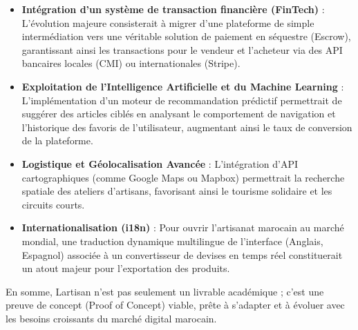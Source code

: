 \begin{itemize}
    \item \textbf{Intégration d'un système de transaction financière (FinTech)} : L'évolution majeure consisterait à migrer d'une plateforme de simple intermédiation vers une véritable solution de paiement en séquestre (Escrow), garantissant ainsi les transactions pour le vendeur et l'acheteur via des API bancaires locales (CMI) ou internationales (Stripe).
    \item \textbf{Exploitation de l'Intelligence Artificielle et du Machine Learning} : L'implémentation d'un moteur de recommandation prédictif permettrait de suggérer des articles ciblés en analysant le comportement de navigation et l'historique des favoris de l'utilisateur, augmentant ainsi le taux de conversion de la plateforme.
    \item \textbf{Logistique et Géolocalisation Avancée} : L'intégration d'API cartographiques (comme Google Maps ou Mapbox) permettrait la recherche spatiale des ateliers d'artisans, favorisant ainsi le tourisme solidaire et les circuits courts.
    \item \textbf{Internationalisation (i18n)} : Pour ouvrir l'artisanat marocain au marché mondial, une traduction dynamique multilingue de l'interface (Anglais, Espagnol) associée à un convertisseur de devises en temps réel constituerait un atout majeur pour l'exportation des produits.
\end{itemize}

En somme, Lartisan n'est pas seulement un livrable académique ; c'est une preuve de concept (Proof of Concept) viable, prête à s'adapter et à évoluer avec les besoins croissants du marché digital marocain.

\ornament
